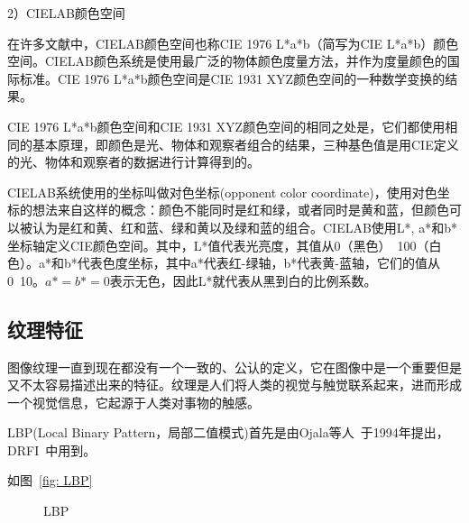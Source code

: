 \documentclass[12pt]{article}
\begin{document}
2）CIELAB颜色空间

在许多文献中，CIELAB颜色空间也称CIE 1976 L*a*b（简写为CIE L*a*b）颜色空间。CIELAB颜色系统是使用最广泛的物体颜色度量方法，并作为度量颜色的国际标准。CIE 1976 L*a*b颜色空间是CIE 1931 XYZ颜色空间的一种数学变换的结果。

CIE 1976 L*a*b颜色空间和CIE 1931 XYZ颜色空间的相同之处是，它们都使用相同的基本原理，即颜色是光、物体和观察者组合的结果，三种基色值是用CIE定义的光、物体和观察者的数据进行计算得到的。

CIELAB系统使用的坐标叫做对色坐标(opponent color coordinate)，使用对色坐标的想法来自这样的概念：颜色不能同时是红和绿，或者同时是黄和蓝，但颜色可以被认为是红和黄、红和蓝、绿和黄以及绿和蓝的组合。CIELAB使用L*, a*和b*坐标轴定义CIE颜色空间。其中，L*值代表光亮度，其值从0（黑色）~100（白色）。a*和b*代表色度坐标，其中a*代表红-绿轴，b*代表黄-蓝轴，它们的值从0~10。$a*=b*=0$表示无色，因此L*就代表从黑到白的比例系数。

\subsection{纹理特征}

图像纹理一直到现在都没有一个一致的、公认的定义，它在图像中是一个重要但是又不太容易描述出来的特征。纹理是人们将人类的视觉与触觉联系起来，进而形成一个视觉信息，它起源于人类对事物的触感。

LBP(Local Binary Pattern，局部二值模式)首先是由Ojala等人~\cite{ojala1994performance}于1994年提出，DRFI~\cite{jiang2013salient}中用到。

如图~\ref{fig: LBP}

\begin{figure}
  \centering 
  \caption{LBP}
  \label{fig: LBP特征} %
\end{figure}
\end{document}
